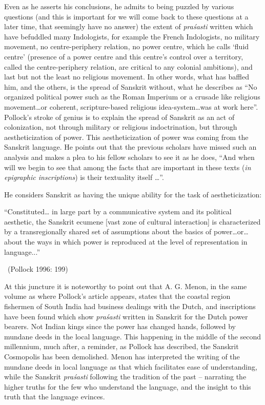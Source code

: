 Even as he asserts his conclusions, he admits to being puzzled by various questions (and this is important for we will come back to these questions at a later time, that seemingly have no answer) the extent of \textit{praśasti} written which have befuddled many Indologists, for example the French Indologists, no military movement, no centre-periphery relation, no power centre, which he calls ‘fluid centre’ (presence of a power centre and this centre’s control over a territory, called the centre-periphery relation, are critical to any colonial ambitions), and last but not the least no religious movement. In other words, what has baffled him, and the others, is the spread of Sanskrit without, what he describes as “No organized political power such as the Roman Imperium or a crusade like religious movement…or coherent, scripture-based religious idea-system…was at work here”. Pollock’s stroke of genius is to explain the spread of Sanskrit as an act of colonization, not through military or religious indoctrination, but through aestheticization of power. This aestheticization of power was coming from the Sanskrit language. He points out that the previous scholars have missed such an analysis and makes a plea to his fellow scholars to see it as he does, “And when will we begin to see that among the facts that are important in these texts (\textit{in epigraphic inscriptions}) is their textuality itself …”.

He considers Sanskrit as having the unique ability for the task of aestheticization:

\begin{myquote}
“Constituted… in large part by a communicative system and its political aesthetic, the Sanskrit ecumene [vast zone of cultural interaction] is characterized by a transregionally shared set of assumptions about the basics of power…or…about the ways in which power is reproduced at the level of representation in language...” 

~\hfill (Pollock 1996: 199)
\end{myquote}

At this juncture it is noteworthy to point out that A. G. Menon, in the same volume as where Pollock’s article appears, states that the coastal region fishermen of South India had business dealings with the Dutch, and inscriptions have been found which show \textit{praśasti} written in Sanskrit for the Dutch power bearers. Not Indian kings since the power has changed hands, followed by mundane deeds in the local language. This happening in the middle of the second millennium, much after, a reminder, as Pollock has described, the Sanskrit Cosmopolis has been demolished. Menon has interpreted the writing of the mundane deeds in local language as that which facilitates ease of understanding, while the Sanskrit \textit{praśasti} following the tradition of the past – narrating the higher truths for the few who understand the language, and the insight to this truth that the language evinces.

